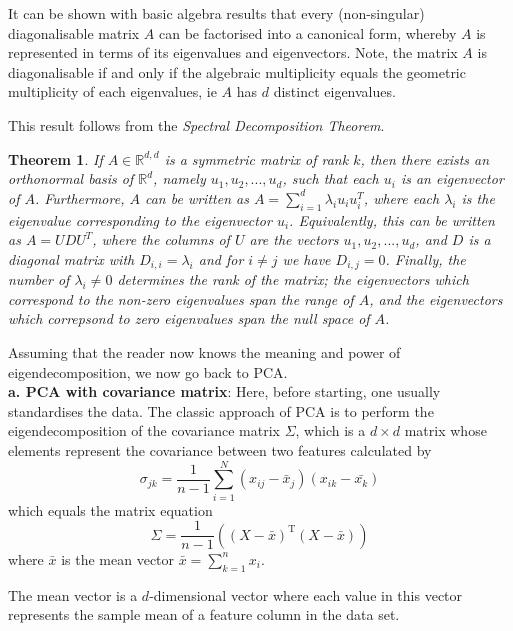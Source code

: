 \documentclass[journal, a4paper]{IEEEtran}
\newtheorem{theorem}{Theorem}[section]
\begin{document}
It can be shown with basic algebra results that every (non-singular) diagonalisable matrix \( A \) can be factorised into a canonical form, whereby \( A \) is represented in terms of its eigenvalues and eigenvectors.
Note, the matrix \( A \) is diagonalisable if and only if the algebraic multiplicity equals the geometric multiplicity of each eigenvalues, ie \( A \) has \( d \) distinct eigenvalues.

This result follows from the \textit{Spectral Decomposition Theorem}. 
\begin{theorem}\label{spectralthm}
	If \( A \in \mathbb{R}^{d,d}\) is a symmetric matrix of rank \( k \), then there exists an orthonormal basis of \( \mathbb{R}^d \), namely \( u_{1}, u_{2}, ..., u_{d} \), such that each \( u_{i} \) is an eigenvector of \( A \). Furthermore, \( A \) can be written as \( A = \sum_{i=1}^{d} \lambda_{i} u_{i} u_{i}^T \), where each \( \lambda_{i} \) is the eigenvalue corresponding to the eigenvector \( u_{i} \). Equivalently, this can be written as \( A = U D U^T \), where the columns of \( U \) are the vectors \( u_{1}, u_{2}, ..., u_{d} \), and \( D \) is a diagonal matrix with \( D_{i,i} = \lambda_{i} \) and for \( i \neq j \) we have \( D_{i,j} = 0 \). Finally, the number of \( \lambda_{i} \neq 0 \) determines the rank of the matrix; the eigenvectors which correspond to the non-zero eigenvalues span the range of \( A \), and the eigenvectors which correpsond to zero eigenvalues span the null space of \( A \).
\end{theorem}


Assuming that the reader now knows the meaning and power of eigendecomposition, we now go back to PCA.\\
\textbf{a. PCA with covariance matrix}:
Here, before starting, one usually standardises the data. %
The classic approach of PCA is to perform the eigendecomposition of the covariance matrix \( \Sigma \), which is a \( d \times d \) matrix whose elements represent the covariance between two features calculated by 
\[
\sigma_{jk} = \frac{1}{n-1} \sum_{i=1}^{N} (x_{ij} - \bar{x}_{j}) (x_{ik} - \bar{x_{k}})
\]
which equals the matrix equation
\[
\Sigma = \frac{1}{n-1} ( (X - \bar{x})^{\text{T}} (X - \bar{x}) )
\]
where \( \bar{x }\) is the mean vector \( \bar{x}= \sum_{k=1}^{n} x_{i}  \).

The mean vector is a \(d\)-dimensional vector where each value in this vector represents the sample mean of a feature column in the data set.
\end{document}
